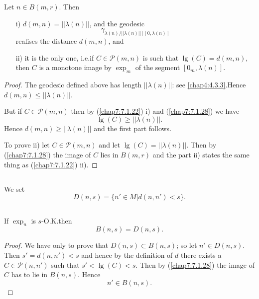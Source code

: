 \begin{theorem*}
Let $n\in B(m,r)$. Then
\begin{itemize}
\item[\rm i)] $d(m,n)=||\lambda(n)||$, and the geodesic
$$
\gamma_{\lambda(n)/||\lambda(n)||\,\big|\, [0,\lambda(n)]}
$$
realises the distance $d(m,n)$, and

\item[\rm ii)] it is the only one, i.e.\@ if $C\in\mathscr{P}(m,n)$ is
  such that $\lg(C)=d(m,n)$, then $C$ is a monotone image by
  $\exp_{m}$ of the segment $[0_{m},\lambda(n)]$.
\end{itemize}
\end{theorem*}

\begin{proof}
The \pageoriginale geodesic defined above has length $||\lambda(n)||$:
see \eqref{chap4:4.3.3}.\break Hence $d(m,n)\leq ||\lambda(n)||$.

But if $C\in\mathscr{P}(m,n)$ then by (\ref{chap7:7.1.22}) i) and
(\ref{chap7:7.1.28}) we have
$$
\lg(C)\geq ||\lambda(n)||.
$$
Hence $d(m,n)\geq ||\lambda(n)||$ and the first part follows.

To prove ii) let $C\in\mathscr{P}(m,n)$ and let
$\lg(C)=||\lambda(n)||$. Then by (\ref{chap7:7.1.28}) the image of $C$
lies in $B(m,r)$ and the part ii) states the same thing as
(\ref{chap7:7.1.22}) ii).
\end{proof}

\subsection{}\label{chap7:7.1.30}

\begin{notation*}
We set
$$
D(n,s)=\{n'\in M|d(n,n')<s\}.
$$
\end{notation*}

\subsection{}\label{chap7:7.1.31}

\begin{coro*}
If $\exp_{n}$ is $s$-O.K.\@ then
$$
B(n,s)=D(n,s).
$$
\end{coro*}

\begin{proof}
We have only to prove that $D(n,s)\subset B(n,s)$; so let $n'\in
D(n,s)$. Then $s'=d(n,n')<s$ and hence by the definition of $d$ there
exists a $C\in\mathscr{P}(n,n')$ such that $s'<\lg(C)<s$. Then by
(\ref{chap7:7.1.28}) the image of $C$ has to lie in $B(n,s)$. Hence
$$
n'\in B(n,s).
$$
\end{proof}

